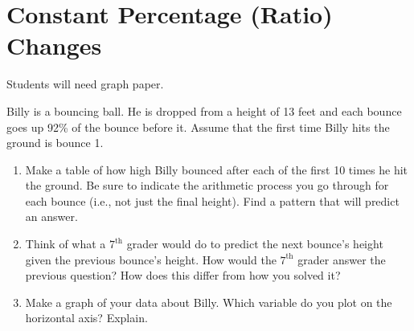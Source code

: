 \newpage
\section{Constant Percentage (Ratio) Changes}\label{A:ConstantRatio}
\begin{teachingnote}
Students will need graph paper.
\end{teachingnote}

\begin{prob}
Billy is a bouncing ball.  He is dropped from a height of 13 feet and each bounce goes up 92\% of the bounce before it.  Assume that the first time Billy hits the ground is bounce 1.  

\begin{enumerate}
\item Make a table 
of how high Billy bounced after each of the first 10 times he hit the ground.  Be sure to indicate the arithmetic process you go through for each bounce (i.e., not just the final height).  Find a pattern that will predict an answer.  

\item Think of what a $7^\mathrm{th}$ grader would do to predict the next bounce's height given the previous bounce's height.  How would the $7^\mathrm{th}$ grader answer the previous question?  How does this differ from how you solved it?

\item Make a graph of your data about Billy.  Which variable do you plot on the horizontal axis?  Explain.  


\end{enumerate}
\end{prob}
